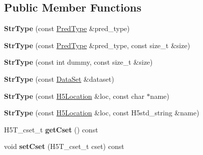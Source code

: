\subsection*{Public Member Functions}
\begin{DoxyCompactItemize}
\item 
\mbox{\label{class_h5_1_1_str_type_ad548b5d6a518c67428f6bf86bdd0c4d8}} 
{\bfseries Str\+Type} (const \hyperlink{class_h5_1_1_pred_type}{Pred\+Type} \&pred\+\_\+type)
\item 
\mbox{\label{class_h5_1_1_str_type_a502e6a4895bf51314204179e3f093a7f}} 
{\bfseries Str\+Type} (const \hyperlink{class_h5_1_1_pred_type}{Pred\+Type} \&pred\+\_\+type, const size\+\_\+t \&size)
\item 
\mbox{\label{class_h5_1_1_str_type_a46d838751b37805908051d8cd7ea07d5}} 
{\bfseries Str\+Type} (const int dummy, const size\+\_\+t \&size)
\item 
\mbox{\label{class_h5_1_1_str_type_aa4075d261048fb635b2e710a2f398d5e}} 
{\bfseries Str\+Type} (const \hyperlink{class_h5_1_1_data_set}{Data\+Set} \&dataset)
\item 
\mbox{\label{class_h5_1_1_str_type_a8a4924370c178bd00a82866ee1d4c3e2}} 
{\bfseries Str\+Type} (const \hyperlink{class_h5_1_1_h5_location}{H5\+Location} \&loc, const char $\ast$name)
\item 
\mbox{\label{class_h5_1_1_str_type_af1ed3a7d611c9ebddc7bae244ca036e0}} 
{\bfseries Str\+Type} (const \hyperlink{class_h5_1_1_h5_location}{H5\+Location} \&loc, const H5std\+\_\+string \&name)
\item 
\mbox{\label{class_h5_1_1_str_type_aaaf069061e0b1fa0ef9ca34f797f9c84}} 
H5\+T\+\_\+cset\+\_\+t {\bfseries get\+Cset} () const
\item 
\mbox{\label{class_h5_1_1_str_type_aafd227ce5183cc51e9b40e976ecde2c7}} 
void {\bfseries set\+Cset} (H5\+T\+\_\+cset\+\_\+t cset) const
\item 
\mbox{\label{class_h5_1_1_str_type_ac48725b2342679db2a3aa43da7d73d81}} 

\end{DoxyCompactItemize}
